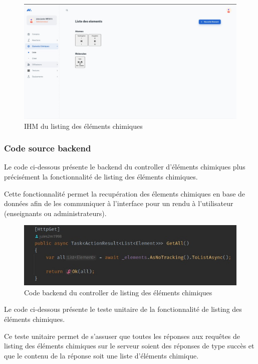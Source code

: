 \begin{figure}[H]
	\centering
	\includegraphics[width=1\textwidth]{img/ietl}
	\caption{IHM du listing des éléments chimiques}
	\label{fig:mesh1}
\end{figure}

\subsubsection{Code source backend}

Le code ci-dessous présente le backend du controller d'éléments chimiques plus précisément la fonctionnalité de listing des éléments chimiques.

Cette fonctionnalité permet la recupération des élements chimiques en base de données afin de les communiquer à l'interface pour un rendu à l'utilisateur (enseignants ou administrateurs).

\begin{figure}[H]
	\centering
	\includegraphics[width=1\textwidth]{img/cetl}
	\caption{Code backend du controller de listing des éléments chimiques}
\end{figure}

Le code ci-dessous présente le teste unitaire de la fonctionnalité de listing des éléments chimiques.

Ce teste unitaire permet de s'assuser que toutes les réponses aux requêtes de listing des éléments chimiques sur le serveur soient des réponses de type succès et que le contenu de la réponse soit une liste d'éléments chimique.

